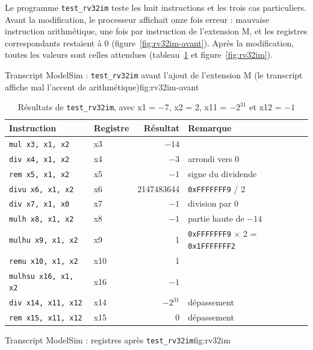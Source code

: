 Le programme \texttt{test\_rv32im} teste les huit instructions et les trois cas particuliers.
Avant la modification, le processeur affichait onze fois \og erreur : mauvaise instruction
arithmétique\fg{}, une fois par instruction de l'extension M, et les registres correspondants
restaient à 0 (figure~\ref{fig:rv32im-avant}). Après la modification, toutes les valeurs sont
celles attendues (tableau~\ref{tab:rv32imres} et figure~\ref{fig:rv32im}).

{Transcript ModelSim : \texttt{test\_rv32im} avant l'ajout de l'extension M (le transcript
affiche mal l'accent de \og arithmétique\fg{})}{fig:rv32im-avant}

\begin{table}[H]
\centering
\begin{tabular}{llrl}
\toprule
Instruction & Registre & Résultat & Remarque \\
\midrule
\texttt{mul x3, x1, x2}     & x3  & $-14$ & \\
\texttt{div x4, x1, x2}     & x4  & $-3$  & arrondi vers 0 \\
\texttt{rem x5, x1, x2}     & x5  & $-1$  & signe du dividende \\
\texttt{divu x6, x1, x2}    & x6  & 2147483644 & \texttt{0xFFFFFFF9} / 2 \\
\texttt{div x7, x1, x0}     & x7  & $-1$  & division par 0 \\
\texttt{mulh x8, x1, x2}    & x8  & $-1$  & partie haute de $-14$ \\
\texttt{mulhu x9, x1, x2}   & x9  & 1     & \texttt{0xFFFFFFF9} $\times$ 2 = \texttt{0x1FFFFFFF2} \\
\texttt{remu x10, x1, x2}   & x10 & 1     & \\
\texttt{mulhsu x16, x1, x2} & x16 & $-1$  & \\
\texttt{div x14, x11, x12}  & x14 & $-2^{31}$ & dépassement \\
\texttt{rem x15, x11, x12}  & x15 & 0     & dépassement \\
\bottomrule
\end{tabular}
\caption{Résultats de \texttt{test\_rv32im}, avec x1 = $-7$, x2 = 2, x11 = $-2^{31}$ et x12 = $-1$}
\label{tab:rv32imres}
\end{table}

{Transcript ModelSim : registres après \texttt{test\_rv32im}}{fig:rv32im}

